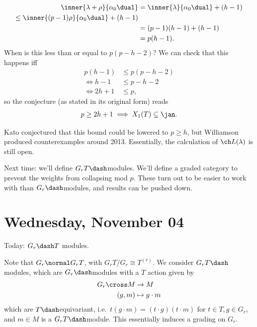 \begin{align*}  
\inner{\lambda+\rho}{\alpha_0\dual} 
&= \inner{\lambda}{\alpha_0\dual} + (h-1) \\
\leq \inner{(p-1) \rho}{\alpha_0\dual} + (h-1)  \\
&= (p-1)(h-1) + (h-1) \\
&= p(h-1) 
.\end{align*} When is this less than or equal to \(p(p-h-2)\)? We can
check that this happens iff
\begin{align*}  
p(h-1) &\leq p(p-h-2) \\
\iff h-1 &\leq p-h-2 \\
\iff 2h+1 &\leq p
,\end{align*} so the conjecture (as stated in its original form) reads
\begin{align*}  
p\geq 2h+1 \implies X_1(T) \subseteq \jan
.\end{align*}

\begin{remark}

Kato conjectured that this bound could be lowered to \(p\geq h\), but
Williamson produced counterexamples around 2013. Essentially, the
calculation of \(\ch L(\lambda)\) is still open.

\end{remark}

Next time: we'll define \(G_rT\dash\)modules. We'll define a graded
category to prevent the weights from collapsing mod \(p\). These turn
out to be easier to work with than \(G_r\dash\)modules, and results can
be pushed down.

\hypertarget{wednesday-november-04}{%
\section{Wednesday, November 04}\label{wednesday-november-04}}

Today: \(G_r\dash T\) modules.

Note that \(G_r\normal G_r T\), with \(G_r T/G_r \cong T^{(r)}\). We
consider \(G_r T\dash\)modules, which are \(G_r\dash\)modules with a
\(T\) action given by
\begin{align*}  
G_r \cross M &\to M \\
(g, m) &\mapsto g\cdot m
\end{align*} which are \(T\dash\)equivariant,
i.e.~\(t(g\cdot m) = (t\cdot g)(t\cdot m)\) for \(t\in T, g\in G_r\),
and \(m\in M\) is a \(G_r T\dash\)module. This essentially induces a
grading on \(G_r\).

